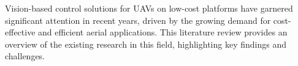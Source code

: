 



Vision-based control solutions for UAVs on low-cost platforms have garnered significant attention in recent years, driven by the growing demand for cost-effective and efficient aerial applications. This literature review provides an overview of the existing research in this field, highlighting key findings and challenges.

